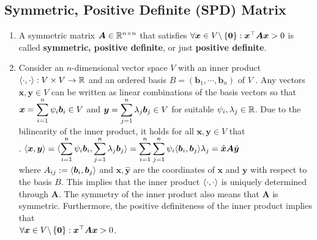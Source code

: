 \subsection{Symmetric, Positive Definite (SPD) Matrix}

\begin{enumerate}
    \item
    \begin{definition}
        A symmetric matrix $\bm{A} \in \mathbb{R}^{n\times n}$ that satisfies $\forall \bm{x} \in V \backslash \left\{\bm{0}\right\} : \bm{x}^\top \bm{Ax} > 0$ is called \textbf{symmetric, positive definite}, or just \textbf{positive definite}.
        \hfill \cite{mfml/book/mml/Deisenroth-Faisal-Ong}
    \end{definition}

    \item Consider an $n$-dimensional vector space $V$ with an inner product $\langle\cdot, \cdot\rangle : V \times V \to \mathbb{R}$ and an ordered basis $B = (\bm{b}_1, \cdots , \bm{b}_n)$ of $V$ .
    Any vectors $\bm{x}, \bm{y} \in  V$ can be written as linear combinations of the basis vectors so that $\bm{x} = \displaystyle\sum^n _{i=1} \psi _i \bm{b}_i \in  V$ and $\bm{y} = \displaystyle\sum ^n _{j=1} \lambda _j \bm{b}_j \in  V$ for suitable $\psi _i , \lambda _j \in  \mathbb{R}$.
    Due to the bilinearity of the inner product, it holds for all $\bm{x}, \bm{y} \in  V$ that
    \hfill \cite{mfml/book/mml/Deisenroth-Faisal-Ong}
    \\
    .\hfill
    $
        \langle\bm{x}, \bm{y}\rangle
        = \langle
            \displaystyle\sum^n _{i=1} \psi _i \bm{b}_i,
            \displaystyle\sum ^n _{j=1} \lambda _j \bm{b}_j
        \rangle
        = \displaystyle\sum^n _{i=1} \displaystyle\sum ^n _{j=1} \psi _i \langle\bm{b}_i, \bm{b}_j\rangle \lambda _j
        = \hat{\bm{x}} \bm{A} \hat{\bm{y}}
    $
    \hfill \cite{mfml/book/mml/Deisenroth-Faisal-Ong}
    \\
    where $A_{ij} := \langle\bm{b}_i , \bm{b}_j\rangle$ and $\hat{\bm{x}}, \hat{\bm{y}}$ are the coordinates of $\bm{x}$ and $\bm{y}$ with respect to the basis $B$.
    This implies that the inner product $\langle\cdot, \cdot\rangle$ is uniquely determined through $\bm{A}$.
    The symmetry of the inner product also means that $\bm{A}$ is symmetric.
    Furthermore, the positive definiteness of the inner product implies that
    \\
    $\forall \bm{x} \in V \backslash \left\{\bm{0}\right\} : \bm{x}^\top \bm{Ax} > 0$.
    \hfill \cite{mfml/book/mml/Deisenroth-Faisal-Ong}


\end{enumerate}
